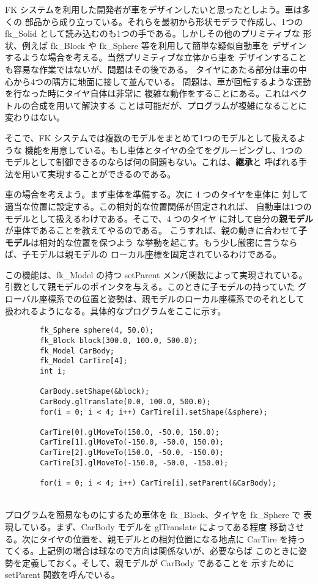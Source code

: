 FK システムを利用した開発者が車をデザインしたいと思ったとしよう。車は多くの
部品から成り立っている。それらを最初から形状モデラで作成し、1つの
fk\_Solid として読み込むのも1つの手である。しかしその他のプリミティブな
形状、例えば fk\_Block や fk\_Sphere 等を利用して簡単な疑似自動車を
デザインするような場合を考える。当然プリミティブな立体から車を
デザインすることも容易な作業ではないが、問題はその後である。
タイヤにあたる部分は車の中心から4つの隅方に地面に接して並んでいる。
問題は、車が回転するような運動を行なった時にタイヤ自体は非常に
複雑な動作をすることにある。これはベクトルの合成を用いて解決する
ことは可能だが、プログラムが複雑になることに変わりはない。

そこで、FK システムでは複数のモデルをまとめて1つのモデルとして扱えるような
機能を用意している。もし車体とタイヤの全てをグルーピングし、1つの
モデルとして制御できるのならば何の問題もない。これは、\textbf{継承}と
呼ばれる手法を用いて実現することができるのである。

車の場合を考えよう。まず車体を準備する。次に 4 つのタイヤを車体に
対して適当な位置に設定する。この相対的な位置関係が固定されれば、
自動車は1つのモデルとして扱えるわけである。そこで、4 つのタイヤ
に対して自分の\textbf{親モデル}が車体であることを教えてやるのである。
こうすれば、親の動きに合わせて\textbf{子モデル}は相対的な位置を保つよう
な挙動を起こす。もう少し厳密に言うならば、子モデルは親モデルの
ローカル座標を固定されているわけである。

この機能は、fk\_Model の持つ setParent メンバ関数によって実現されている。
引数として親モデルのポインタを与える。このときに子モデルの持っていた
グローバル座標系での位置と姿勢は、親モデルのローカル座標系でのそれとして
扱われるようになる。具体的なプログラムをここに示す。
\\
\begin{breakbox}
\begin{verbatim}
        fk_Sphere sphere(4, 50.0);
        fk_Block block(300.0, 100.0, 500.0);
        fk_Model CarBody;
        fk_Model CarTire[4];
        int i;

        CarBody.setShape(&block);
        CarBody.glTranslate(0.0, 100.0, 500.0);
        for(i = 0; i < 4; i++) CarTire[i].setShape(&sphere);

        CarTire[0].glMoveTo(150.0, -50.0, 150.0);
        CarTire[1].glMoveTo(-150.0, -50.0, 150.0);
        CarTire[2].glMoveTo(150.0, -50.0, -150.0);
        CarTire[3].glMoveTo(-150.0, -50.0, -150.0);

        for(i = 0; i < 4; i++) CarTire[i].setParent(&CarBody);
\end{verbatim}
\end{breakbox}
~ \\
プログラムを簡易なものにするため車体を fk\_Block、タイヤを fk\_Sphere で
表現している。まず、CarBody モデルを glTranslate によってある程度
移動させる。次にタイヤの位置を、親モデルとの相対位置になる地点に
CarTire を持ってくる。上記例の場合は球なので方向は関係ないが、必要ならば
このときに姿勢を定義しておく。そして、親モデルが CarBody であることを
示すために setParent 関数を呼んでいる。

